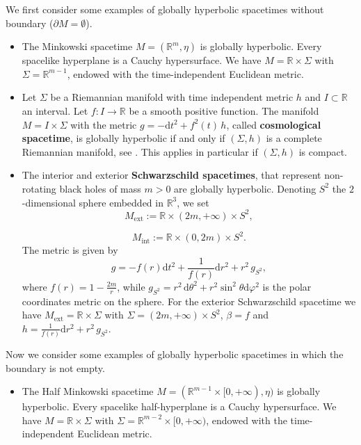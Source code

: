 \begin{Example}
	We first consider some examples of globally hyperbolic spacetimes without boundary ($\partial M=\emptyset$).
	\begin{itemize}
		\item The Minkowski spacetime $M=(\mathbb{R}^m,\eta)$ is globally hyperbolic. Every spacelike hyperplane is a Cauchy hypersurface. We have $M=\mathbb{R}\times \Sigma$ with $\Sigma = \mathbb{R}^{m-1}$, endowed with the time-independent Euclidean metric.
		\item Let $\Sigma$ be a Riemannian manifold with time independent metric $h$ and $I\subset\mathbb{R}$ an interval. Let $f: I\to\mathbb{R}$	be a smooth positive function. The manifold $M=I \times \Sigma$ with the metric $g = -\mathrm{d} t^2 + f^2(t)\, h$, called \textbf{cosmological spacetime}, is globally hyperbolic if and only if $(\Sigma,h)$ is a complete Riemannian manifold, see \cite[Lem A.5.14]{Baer-Ginoux-Pfaffle-07}. This applies in particular if $(\Sigma,h)$ is compact.
		\item The interior and exterior \textbf{Schwarzschild spacetimes}, that represent non-rotating black holes of mass $m>0$ are globally hyperbolic.
		Denoting $S^2$ the $2$-dimensional sphere embedded in $\mathbb{R}^3$, we set
		\[	 M_{\text{ext}}:=\mathbb{R}\times(2m,+\infty)	\times S^2,	\] 
		
		\[	 M_{\text{int}}:=\mathbb{R}\times(0,2m)	\times S^2.	\] 
		The metric is given by
		\[	g=-f(r) \mathrm{d} t^2+\frac{1}{f(r)} \mathrm{d} r^2	+r^2\,g_{S^2},	\]
		where $f(r)=1-\frac{2m}{r}$, while $g_{S^2}=r^2\, \mathrm{d}\theta^2+r^2\sin^2\theta \mathrm{d}\varphi^2$ is the polar coordinates metric on the sphere. For the exterior Schwarzschild spacetime we have $ M_{\text{ext}}=\mathbb{R}\times \Sigma$ with $\Sigma=(2m,+\infty)\times S^2$, $\beta=f$ and $h=\frac{1}{f(r)} \mathrm{d} r^2	+r^2\,g_{S^2}$.
	\end{itemize}
\end{Example}

\begin{Example}
	Now we consider some examples of globally hyperbolic spacetimes in which the boundary is not empty.
	\begin{itemize}
		\item The Half Minkowski spacetime $M=(\mathbb{R}^{m-1}\times[0,+\infty),\eta)$ is globally hyperbolic. Every spacelike half-hyperplane is a Cauchy hypersurface. We have $M=\mathbb{R}\times \Sigma$ with $\Sigma= \mathbb{R}^{m-2}\times[0,+\infty)$, endowed with the time-independent Euclidean metric.
	\end{itemize}
\end{Example}

